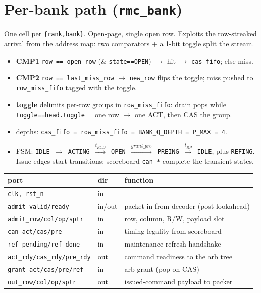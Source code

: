 \documentclass[10pt]{article}
\newcommand{\sig}[1]{\texttt{\small #1}}
\newcommand{\blk}[1]{\textbf{#1}}
\begin{document}
\section{Per-bank path (\texttt{rmc\_bank})}
One cell per \sig{\{rank,bank\}}. Open-page, single open row. Exploits the row-streaked arrival from
the address map: two comparators + a 1-bit toggle split the stream.
\begin{itemize}\itemsep1pt
\item \blk{CMP1} \sig{row == open_row} (\& \sig{state==OPEN}) $\to$ hit $\to$ \sig{cas_fifo}; else miss.
\item \blk{CMP2} \sig{row == last_miss_row} $\to$ \sig{new_row} flips the toggle; miss pushed to
\sig{row_miss_fifo} tagged with the toggle.
\item \blk{toggle} delimits per-row groups in \sig{row_miss_fifo}: drain pops while
\sig{toggle==head.toggle} = one row $\to$ one ACT, then CAS the group.
\item depths: \sig{cas_fifo = row_miss_fifo = BANK_Q_DEPTH = P_MAX = 4}.
\item FSM: \sig{IDLE $\to$ ACTING $\xrightarrow{t_{RCD}}$ OPEN $\xrightarrow{grant\_pre}$ PREING
$\xrightarrow{t_{RP}}$ IDLE}, plus \sig{REFING}. Issue edges start transitions; scoreboard \sig{can_*}
complete the transient states.
\end{itemize}
\begin{longtable}{P{3.6cm} P{1.3cm} P{9.6cm}}
\toprule \blk{port} & \blk{dir} & \blk{function}\\ \midrule \endhead
\sig{clk, rst_n} & in & \\
\sig{admit_valid/ready} & in/out & packet in from decoder (post-lookahead)\\
\sig{admit_row/col/op/sptr} & in & row, column, R/W, payload slot\\
\sig{can_act/cas/pre} & in & timing legality from scoreboard\\
\sig{ref_pending/ref_done} & in & maintenance refresh handshake\\
\sig{act_rdy/cas_rdy/pre_rdy} & out & command readiness to the arb tree\\
\sig{grant_act/cas/pre/ref} & in & arb grant (pop on CAS)\\
\sig{out_row/col/op/sptr} & out & issued-command payload to packer\\
\bottomrule
\end{longtable}

\end{document}
